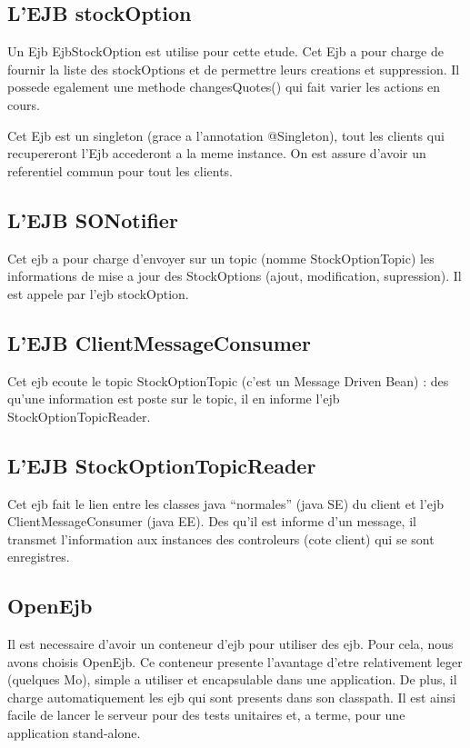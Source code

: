 \subsection{L'EJB stockOption}
Un Ejb EjbStockOption est utilise pour cette etude. Cet Ejb a pour charge de fournir la liste des stockOptions et de permettre leurs creations et suppression. Il possede egalement une methode changesQuotes() qui fait varier les actions en cours. 

Cet Ejb est un singleton (grace a l'annotation @Singleton), tout les clients qui recupereront l'Ejb accederont a la meme instance. On est assure d'avoir un referentiel commun pour tout les clients.

\subsection{L'EJB SONotifier}
Cet ejb a pour charge d'envoyer sur un topic (nomme StockOptionTopic) les informations de mise a jour des StockOptions (ajout, modification, supression). Il est appele par l'ejb stockOption.

\subsection{L'EJB ClientMessageConsumer}
Cet ejb ecoute le topic StockOptionTopic (c'est un Message Driven Bean) : des qu'une information est poste sur le topic, il en informe l'ejb StockOptionTopicReader.

\subsection{L'EJB StockOptionTopicReader}
Cet ejb fait le lien entre les classes java ``normales'' (java SE) du client et l'ejb ClientMessageConsumer (java EE). Des qu'il est informe d'un message, il transmet l'information aux instances des controleurs (cote client) qui se sont enregistres.

\subsection{OpenEjb}
Il est necessaire d'avoir un conteneur d'ejb pour utiliser des ejb. Pour cela, nous avons choisis OpenEjb. Ce conteneur presente l'avantage d'etre relativement leger (quelques Mo), simple a utiliser et encapsulable dans une application. De plus, il charge automatiquement les ejb qui sont presents dans son classpath. Il est ainsi facile de lancer le serveur pour des tests unitaires et, a terme, pour une application stand-alone. 


